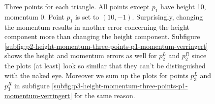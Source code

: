 \begin{figure}[ht!]

  \caption{Three points for each triangle. All points except $p_1$ have height 10, momentum 0. Point $p_1$ is set to $(10,-1)$. Surprisingly, changing the momentum results in  another error concerning the height component more than changing the height component. Subfigure \ref{subfig:p2-height-momentum-three-points-p1-momentum-verringert} shows the height and momentum errors as well for $p_2^L$ and $p_2^R$ since the plots (at least) look so similar that they can't be distinguished with the naked eye. Moreover we sum up the plots for points $p_3^L$ and $p_3^R$ in subfigure \ref{subfig:p3-height-momentum-three-points-p1-momentum-verringert} for the same reason.
}
  \label{fig:three-points-u1-}
\end{figure}


